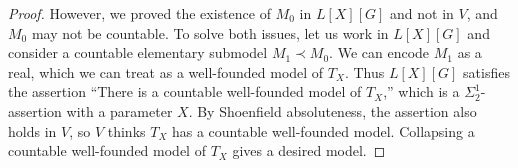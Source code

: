 \documentclass[10pt,a4paper]{amsart}
\begin{document}
\begin{proof}
    However, we proved the existence of $M_0$ in $L[X][G]$ and not in $V$, and $M_0$ may not be countable. To solve both issues, let us work in $L[X][G]$ and consider a countable elementary submodel $M_1\prec M_0$. We can encode $M_1$ as a real, which we can treat as a well-founded model of $T_X$. Thus $L[X][G]$ satisfies the assertion ``There is a countable well-founded model of $T_X$,'' which is a $\Sigma^1_2$-assertion with a parameter $X$.
    By Shoenfield absoluteness, the assertion also holds in $V$, so $V$ thinks $T_X$ has a countable well-founded model. Collapsing a countable well-founded model of $T_X$ gives a desired model.
\end{proof}
\end{document}
